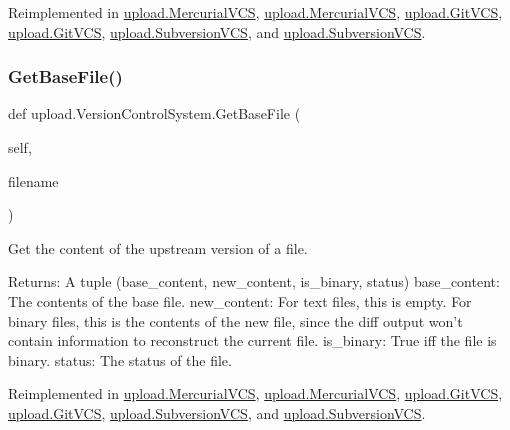 Reimplemented in \mbox{\hyperlink{classupload_1_1_mercurial_v_c_s_a0cdc0cbe6ac4daab82f5f01e6ae2e670}{upload.\+Mercurial\+V\+CS}}, \mbox{\hyperlink{classupload_1_1_mercurial_v_c_s_a0cdc0cbe6ac4daab82f5f01e6ae2e670}{upload.\+Mercurial\+V\+CS}}, \mbox{\hyperlink{classupload_1_1_git_v_c_s_a70ddb65a6b512b8cb8cc4affa37ff9b4}{upload.\+Git\+V\+CS}}, \mbox{\hyperlink{classupload_1_1_git_v_c_s_a70ddb65a6b512b8cb8cc4affa37ff9b4}{upload.\+Git\+V\+CS}}, \mbox{\hyperlink{classupload_1_1_subversion_v_c_s_a29dec4941de0824734d6842a2f33ffc3}{upload.\+Subversion\+V\+CS}}, and \mbox{\hyperlink{classupload_1_1_subversion_v_c_s_a29dec4941de0824734d6842a2f33ffc3}{upload.\+Subversion\+V\+CS}}.

\mbox{\label{classupload_1_1_version_control_system_adfd9d4ecba422102233a2ba13e5bfaf5}} 
\subsubsection{\texorpdfstring{GetBaseFile()}{GetBaseFile()}\hspace{0.1cm}{\footnotesize\ttfamily [2/2]}}
{\footnotesize\ttfamily def upload.\+Version\+Control\+System.\+Get\+Base\+File (\begin{DoxyParamCaption}\item[{}]{self,  }\item[{}]{filename }\end{DoxyParamCaption})}

\begin{DoxyVerb}Get the content of the upstream version of a file.

Returns:
  A tuple (base_content, new_content, is_binary, status)
base_content: The contents of the base file.
new_content: For text files, this is empty.  For binary files, this is
  the contents of the new file, since the diff output won't contain
  information to reconstruct the current file.
is_binary: True iff the file is binary.
status: The status of the file.
\end{DoxyVerb}
 

Reimplemented in \mbox{\hyperlink{classupload_1_1_mercurial_v_c_s_a0cdc0cbe6ac4daab82f5f01e6ae2e670}{upload.\+Mercurial\+V\+CS}}, \mbox{\hyperlink{classupload_1_1_mercurial_v_c_s_a0cdc0cbe6ac4daab82f5f01e6ae2e670}{upload.\+Mercurial\+V\+CS}}, \mbox{\hyperlink{classupload_1_1_git_v_c_s_a70ddb65a6b512b8cb8cc4affa37ff9b4}{upload.\+Git\+V\+CS}}, \mbox{\hyperlink{classupload_1_1_git_v_c_s_a70ddb65a6b512b8cb8cc4affa37ff9b4}{upload.\+Git\+V\+CS}}, \mbox{\hyperlink{classupload_1_1_subversion_v_c_s_a29dec4941de0824734d6842a2f33ffc3}{upload.\+Subversion\+V\+CS}}, and \mbox{\hyperlink{classupload_1_1_subversion_v_c_s_a29dec4941de0824734d6842a2f33ffc3}{upload.\+Subversion\+V\+CS}}.

